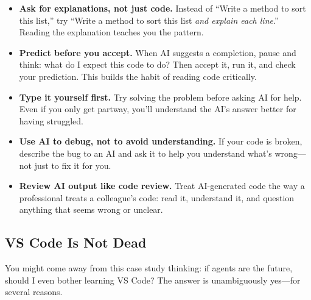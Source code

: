 \documentclass[11pt,letterpaper]{article}
\begin{document}
\begin{tipbox}
\begin{itemize}[itemsep=4pt]
    \item \textbf{Ask for explanations, not just code.} Instead of ``Write a method to sort this list,'' try ``Write a method to sort this list \textit{and explain each line}.'' Reading the explanation teaches you the pattern.

    \item \textbf{Predict before you accept.} When AI suggests a completion, pause and think: what do I expect this code to do? Then accept it, run it, and check your prediction. This builds the habit of reading code critically.

    \item \textbf{Type it yourself first.} Try solving the problem before asking AI for help. Even if you only get partway, you'll understand the AI's answer better for having struggled.

    \item \textbf{Use AI to debug, not to avoid understanding.} If your code is broken, describe the bug to an AI and ask it to help you understand what's wrong---not just to fix it for you.

    \item \textbf{Review AI output like code review.} Treat AI-generated code the way a professional treats a colleague's code: read it, understand it, and question anything that seems wrong or unclear.
\end{itemize}
\end{tipbox}

\subsection{VS Code Is Not Dead}

You might come away from this case study thinking: if agents are the future, should I even bother learning VS Code? The answer is unambiguously yes---for several reasons.
\end{document}
